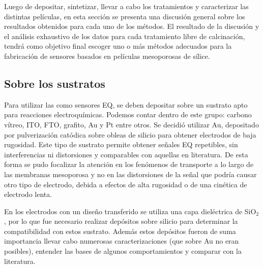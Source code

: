 			Luego de depositar, sintetizar, llevar a cabo los tratamientos y caracterizar las distintas películas, en esta sección se presenta una discusión general sobre los resultados obtenidos para cada uno de los métodos. El resultado de la discusión y el análisis exhaustivo de los datos para cada tratamiento libre de calcinación, tendrá como objetivo final escoger uno o más métodos adecuados para la fabricación de sensores basados en películas mesoporosas de sílice.

	\subsection{Sobre los sustratos}

			Para utilizar las \pdm\space como sensores EQ, se deben depositar sobre un sustrato apto para reacciones electroquímicas. Podemos contar dentro de este grupo: carbono vítreo, ITO, FTO, grafito, Au y Pt entre otros. Se decidió utilizar Au, depositado por pulverización catódica sobre obleas de silicio para obtener electrodos de baja rugosidad. Este tipo de sustrato permite obtener señales EQ repetibles, sin interferencias ni distorsiones y comparables con aquellas en literatura.\cite{Wi2000,Bockris1974} De esta forma se pudo focalizar la atención en los fenómenos de transporte a lo largo de las membranas mesoporosa y no en las distorsiones de la señal que podría causar otro tipo de electrodo, debida a efectos de alta rugosidad o de una cinética de electrodo lenta.
		
		    En los electrodos con un diseño transferido se utiliza una capa dieléctrica de SiO$_2$, por lo que fue necesario realizar depósitos sobre silicio para determinar la compatibilidad con estos sustrato. Además estos depósitos fueron de suma importancia llevar cabo numerosas caracterizaciones (que sobre Au no eran posibles), entender las bases de algunos comportamientos y comparar con la literatura.\cite{Innocenzi2013}

